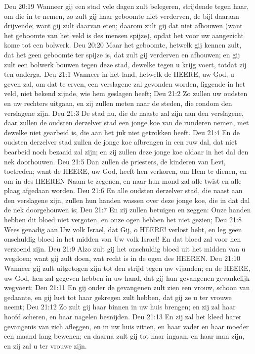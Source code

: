 Deu 20:19  Wanneer gij een stad vele dagen zult belegeren, strijdende tegen haar, om die in te nemen, zo zult gij haar geboomte niet verderven, de bijl daaraan drijvende; want gij zult daarvan eten; daarom zult gij dat niet afhouwen (want het geboomte van het veld is des mensen spijze), opdat het voor uw aangezicht kome tot een bolwerk.
Deu 20:20  Maar het geboomte, hetwelk gij kennen zult, dat het geen geboomte ter spijze is, dat zult gij verderven en afhouwen; en gij zult een bolwerk bouwen tegen deze stad, dewelke tegen u krijg voert, totdat zij ten onderga.
Deu 21:1  Wanneer in het land, hetwelk de HEERE, uw God, u geven zal, om dat te erven, een verslagene zal gevonden worden, liggende in het veld, niet bekend zijnde, wie hem geslagen heeft;
Deu 21:2  Zo zullen uw oudsten en uw rechters uitgaan, en zij zullen meten naar de steden, die rondom den verslagene zijn.
Deu 21:3  De stad nu, die de naaste zal zijn aan den verslagene, daar zullen de oudsten derzelver stad een jonge koe van de runderen nemen, met dewelke niet gearbeid is, die aan het juk niet getrokken heeft.
Deu 21:4  En de oudsten derzelver stad zullen de jonge koe afbrengen in een ruw dal, dat niet bearbeid noch bezaaid zal zijn; en zij zullen deze jonge koe aldaar in het dal den nek doorhouwen.
Deu 21:5  Dan zullen de priesters, de kinderen van Levi, toetreden; want de HEERE, uw God, heeft hen verkoren, om Hem te dienen, en om in des HEEREN Naam te zegenen, en naar hun mond zal alle twist en alle plaag afgedaan worden.
Deu 21:6  En alle oudsten derzelver stad, die naast aan den verslagene zijn, zullen hun handen wassen over deze jonge koe, die in dat dal de nek doorgehouwen is;
Deu 21:7  En zij zullen betuigen en zeggen: Onze handen hebben dit bloed niet vergoten, en onze ogen hebben het niet gezien;
Deu 21:8  Wees genadig aan Uw volk Israel, dat Gij, o HEERE! verlost hebt, en leg geen onschuldig bloed in het midden van Uw volk Israel! En dat bloed zal voor hen verzoend zijn.
Deu 21:9  Alzo zult gij het onschuldig bloed uit het midden van u wegdoen; want gij zult doen, wat recht is in de ogen des HEEREN.
Deu 21:10  Wanneer gij zult uitgetogen zijn tot den strijd tegen uw vijanden; en de HEERE, uw God, hen zal gegeven hebben in uw hand, dat gij hun gevangenen gevankelijk wegvoert;
Deu 21:11  En gij onder de gevangenen zult zien een vrouw, schoon van gedaante, en gij lust tot haar gekregen zult hebben, dat gij ze u ter vrouwe neemt;
Deu 21:12  Zo zult gij haar binnen in uw huis brengen; en zij zal haar hoofd scheren, en haar nagelen besnijden.
Deu 21:13  En zij zal het kleed harer gevangenis van zich afleggen, en in uw huis zitten, en haar vader en haar moeder een maand lang bewenen; en daarna zult gij tot haar ingaan, en haar man zijn, en zij zal u ter vrouwe zijn.
